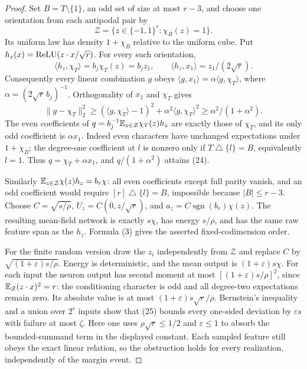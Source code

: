 \begin{proof}
Set $B=T\setminus\{1\}$, an odd set of size at most $r-3$, and choose
one orientation from each antipodal pair by
\[
             \mathcal Z=\{z\in\{-1,1\}^r:\chi_B(z)=1\}.
\]
Its uniform law has density $1+\chi_B$ relative to the uniform cube.
Put $h_z(x)=\operatorname{ReLU}(z\cdot x/\sqrt r)$.
For every such orientation,
\[
 \langle h_z,\chi_T\rangle=b_j\chi_T(z)=b_jz_1,
 \qquad \langle h_z,x_1\rangle=z_1/(2\sqrt r).
\]
Consequently every linear combination $g$ obeys
$\langle g,x_1\rangle=\alpha\langle g,\chi_T\rangle$,
where $\alpha=(2\sqrt r\,b_j)^{-1}$.
Orthogonality of $x_1$ and $\chi_T$ gives
\[
 \|g-\chi_T\|_2^2\ge
 (\langle g,\chi_T\rangle-1)^2+
                   \alpha^2\langle g,\chi_T\rangle^2
 \ge\alpha^2/(1+\alpha^2).
\]
The even coefficients of
$q=b_j^{-1}\mathbb E_{z\in\mathcal Z}\chi_T(z)h_z$ are exactly those
of $\chi_T$, and its only odd coefficient is $\alpha x_1$.
Indeed even characters have unchanged expectations under $1+\chi_B$;
the degree-one coefficient at $l$ is nonzero only if
$T\mathbin\triangle\{l\}=B$, equivalently $l=1$.
Thus $q=\chi_T+\alpha x_1$, and $q/(1+\alpha^2)$ attains (24).

Similarly
$\mathbb E_{z\in\mathcal Z}\chi(z)h_z=b_r\chi$: all even coefficients
except full parity vanish, and an odd coefficient would require
$[r]\mathbin\triangle\{l\}=B$, impossible because $|B|\le r-3$.
Choose $C=\sqrt{s/\rho}$, $U_z=C(0,z/\sqrt r)$, and
$a_z=C\operatorname{sgn}(b_r)\chi(z)$.
The resulting mean-field network is exactly $s\chi$, has energy $s/\rho$,
and has the same raw feature span as the $h_z$. Formula (3) gives
the asserted fixed-codimension order.

For the finite random version draw the $z_i$ independently from
$\mathcal Z$ and replace $C$ by $\sqrt{(1+\varepsilon)s/\rho}$.
Energy is deterministic, and the mean output is $(1+\varepsilon)s\chi$.
For each input the neuron output has second moment at most
$[(1+\varepsilon)s/\rho]^2$, since
$\mathbb E_{\mathcal Z}(z\cdot x)^2=r$: the conditioning character is odd
and all degree-two expectations remain zero.
Its absolute value is at most $(1+\varepsilon)s\sqrt r/\rho$.
Bernstein's inequality and a union over $2^r$ inputs show that (25)
bounds every one-sided deviation by $\varepsilon s$ with failure at
most $\zeta$. Here one uses $\rho\sqrt r\le1/2$ and
$\varepsilon\le1$ to absorb the bounded-summand term in the displayed
constant. Each sampled feature still obeys the exact linear relation,
so the obstruction holds for every realization, independently of the
margin event.
\end{proof}

